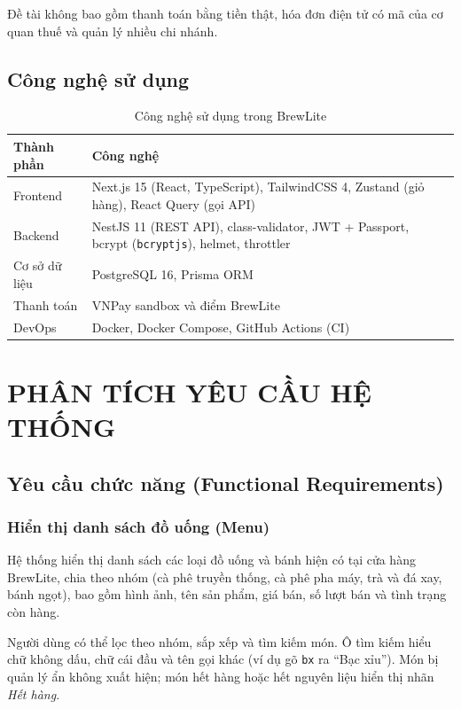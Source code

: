 \documentclass[12pt,a4paper]{article}
\begin{document}
Đề tài không bao gồm thanh toán bằng tiền thật, hóa đơn điện tử có mã của cơ quan thuế và quản lý nhiều chi nhánh.

\subsection{Công nghệ sử dụng}
\begin{table}[H]
\centering
\caption{Công nghệ sử dụng trong BrewLite}
\begin{tabularx}{\textwidth}{|l|X|}
\hline
\textbf{Thành phần} & \textbf{Công nghệ} \\ \hline
Frontend      & Next.js 15 (React, TypeScript), TailwindCSS 4, Zustand (giỏ hàng), React Query (gọi API) \\ \hline
Backend       & NestJS 11 (REST API), class-validator, JWT + Passport, bcrypt (\texttt{bcryptjs}), helmet, throttler \\ \hline
Cơ sở dữ liệu & PostgreSQL 16, Prisma ORM \\ \hline
Thanh toán    & VNPay sandbox và điểm BrewLite \\ \hline
DevOps        & Docker, Docker Compose, GitHub Actions (CI) \\ \hline
\end{tabularx}
\end{table}

\newpage
\section{PHÂN TÍCH YÊU CẦU HỆ THỐNG}
\subsection{Yêu cầu chức năng (Functional Requirements)}

\subsubsection{Hiển thị danh sách đồ uống (Menu)}
Hệ thống hiển thị danh sách các loại đồ uống và bánh hiện có tại cửa hàng BrewLite, chia theo nhóm (cà phê truyền thống, cà phê pha máy, trà và đá xay, bánh ngọt), bao gồm hình ảnh, tên sản phẩm, giá bán, số lượt bán và tình trạng còn hàng.

Người dùng có thể lọc theo nhóm, sắp xếp và tìm kiếm món. Ô tìm kiếm hiểu chữ không dấu, chữ cái đầu và tên gọi khác (ví dụ gõ \texttt{bx} ra ``Bạc xỉu''). Món bị quản lý ẩn không xuất hiện; món hết hàng hoặc hết nguyên liệu hiển thị nhãn \textit{Hết hàng}.
\end{document}
